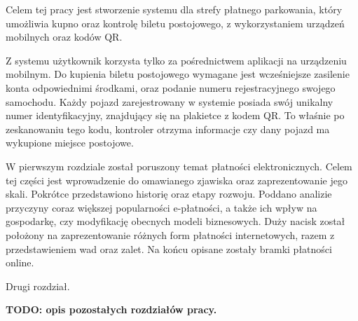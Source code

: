 Celem tej pracy jest stworzenie systemu dla strefy płatnego parkowania, który  umożliwia kupno oraz kontrolę biletu postojowego, z wykorzystaniem urządzeń mobilnych oraz kodów QR.

Z systemu użytkownik korzysta tylko za pośrednictwem aplikacji na urządzeniu mobilnym. Do kupienia biletu postojowego wymagane jest wcześniejsze zasilenie konta odpowiednimi środkami, oraz podanie numeru rejestracyjnego swojego samochodu. Każdy pojazd zarejestrowany w systemie posiada swój unikalny numer identyfikacyjny, znajdujący się na plakietce z kodem QR. To właśnie po zeskanowaniu tego kodu, kontroler otrzyma informacje czy dany pojazd ma wykupione miejsce postojowe.

W pierwszym rozdziale został poruszony temat płatności elektronicznych. Celem tej części jest wprowadzenie do omawianego zjawiska oraz zaprezentowanie jego skali. Pokrótce przedstawiono historię oraz etapy rozwoju. Poddano analizie przyczyny coraz większej popularności e-płatności, a także ich wpływ na gospodarkę, czy modyfikację obecnych modeli biznesowych. Duży nacisk został położony na zaprezentowanie różnych form płatności internetowych, razem z przedstawieniem wad oraz zalet. Na końcu opisane zostały bramki płatności online.

Drugi rozdział.

\textbf{TODO: opis pozostałych rozdziałów pracy.}

